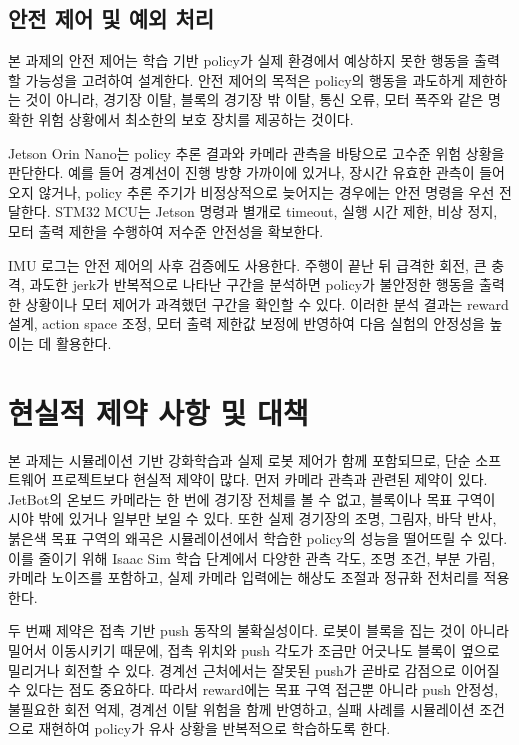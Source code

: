 \documentclass[titlepage]{pnureport}
\begin{document}
\section{안전 제어 및 예외 처리}

본 과제의 안전 제어는 학습 기반 policy가 실제 환경에서 예상하지 못한 행동을 출력할 가능성을 고려하여 설계한다. 안전 제어의 목적은 policy의 행동을 과도하게 제한하는 것이 아니라, 경기장 이탈, 블록의 경기장 밖 이탈, 통신 오류, 모터 폭주와 같은 명확한 위험 상황에서 최소한의 보호 장치를 제공하는 것이다.

Jetson Orin Nano는 policy 추론 결과와 카메라 관측을 바탕으로 고수준 위험 상황을 판단한다. 예를 들어 경계선이 진행 방향 가까이에 있거나, 장시간 유효한 관측이 들어오지 않거나, policy 추론 주기가 비정상적으로 늦어지는 경우에는 안전 명령을 우선 전달한다. STM32 MCU는 Jetson 명령과 별개로 timeout, 실행 시간 제한, 비상 정지, 모터 출력 제한을 수행하여 저수준 안전성을 확보한다.

IMU 로그는 안전 제어의 사후 검증에도 사용한다. 주행이 끝난 뒤 급격한 회전, 큰 충격, 과도한 jerk가 반복적으로 나타난 구간을 분석하면 policy가 불안정한 행동을 출력한 상황이나 모터 제어가 과격했던 구간을 확인할 수 있다. 이러한 분석 결과는 reward 설계, action space 조정, 모터 출력 제한값 보정에 반영하여 다음 실험의 안정성을 높이는 데 활용한다.

\chapter{현실적 제약 사항 및 대책}

본 과제는 시뮬레이션 기반 강화학습과 실제 로봇 제어가 함께 포함되므로, 단순 소프트웨어 프로젝트보다 현실적 제약이 많다. 먼저 카메라 관측과 관련된 제약이 있다. JetBot의 온보드 카메라는 한 번에 경기장 전체를 볼 수 없고, 블록이나 목표 구역이 시야 밖에 있거나 일부만 보일 수 있다. 또한 실제 경기장의 조명, 그림자, 바닥 반사, 붉은색 목표 구역의 왜곡은 시뮬레이션에서 학습한 policy의 성능을 떨어뜨릴 수 있다. 이를 줄이기 위해 Isaac Sim 학습 단계에서 다양한 관측 각도, 조명 조건, 부분 가림, 카메라 노이즈를 포함하고, 실제 카메라 입력에는 해상도 조절과 정규화 전처리를 적용한다.

두 번째 제약은 접촉 기반 push 동작의 불확실성이다. 로봇이 블록을 집는 것이 아니라 밀어서 이동시키기 때문에, 접촉 위치와 push 각도가 조금만 어긋나도 블록이 옆으로 밀리거나 회전할 수 있다. 경계선 근처에서는 잘못된 push가 곧바로 감점으로 이어질 수 있다는 점도 중요하다. 따라서 reward에는 목표 구역 접근뿐 아니라 push 안정성, 불필요한 회전 억제, 경계선 이탈 위험을 함께 반영하고, 실패 사례를 시뮬레이션 조건으로 재현하여 policy가 유사 상황을 반복적으로 학습하도록 한다.
\end{document}
